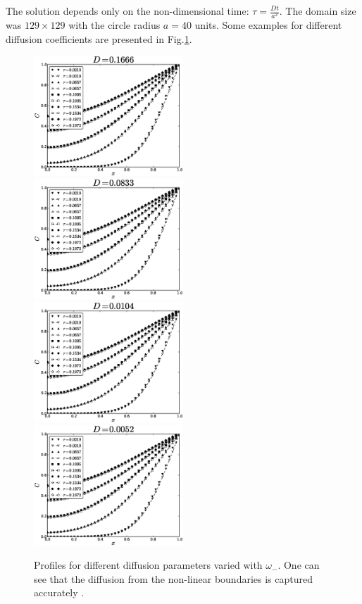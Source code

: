 \documentclass{article}
\newcommand{\omegaminus}{\omega_{-}}
\begin{document}
The solution depends only on the non-dimensional time: $\tau=\frac{D t}{a^2}$. The domain size was $129\times 129$ with the circle radius $a=40$ units. Some examples for
different diffusion coefficients are presented in Fig.\ref{fig:cylinder:benchmark}.
\begin{figure}[htb!]
\includegraphics[width=0.5\textwidth]{Figures/cylinder1666.eps}
\includegraphics[width=0.5\textwidth]{Figures/cylinder0833.eps}\\
\includegraphics[width=0.5\textwidth]{Figures/cylinder0104.eps}
\includegraphics[width=0.5\textwidth]{Figures/cylinder0052.eps}\\
\caption{Profiles for different diffusion parameters varied with $\omegaminus$. One can see that the diffusion from the non-linear boundaries is captured
accurately \label{fig:cylinder:benchmark}.}
\end{figure}
\end{document}
